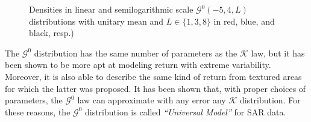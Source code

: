 \documentclass{beamer}
\begin{document}
\begin{frame}
\begin{figure}[hbt]
\centering
{}
\caption[Densities in linear and semilogarithmic scale $\mathcal G^0(-5,4,L)$ distributions with unitary mean and $L\in\{1,3,8\}$]{Densities in linear and semilogarithmic scale $\mathcal G^0(-5,4,L)$ distributions with unitary mean and $L\in\{1,3,8\}$ in red, blue, and black, resp.)}\label{Fig:GI0DistributionLooks}
\end{figure}
\end{frame}


\begin{frame}
The $\mathcal{G}^0$ distribution has the same number of parameters as the $\mathcal{K}$ law, but it has been shown to be more apt at modeling return with extreme variability.
Moreover, it is also able to describe the same kind of return from textured areas for which the latter was proposed.
It has been shown that, with proper choices of parameters, the $\mathcal G^0$ law can approximate with any error any $\mathcal K$ distribution.
For these reasons, the $\mathcal G^0$ distribution is called \textit{``Universal Model''} for SAR data.
\end{frame}
\end{document}
